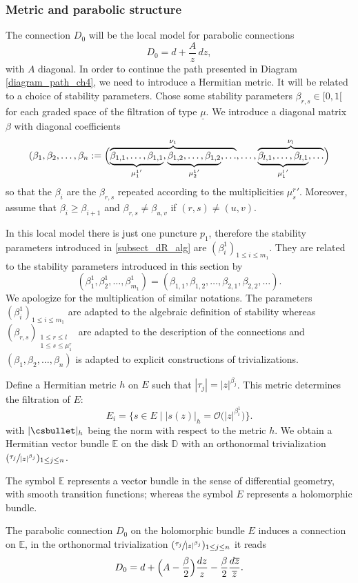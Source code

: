 \subsubsection{Metric and parabolic structure}
The connection $D_0$ will be the local model for parabolic connections
\[
D_0 = d + \frac{A}{z}\, dz,
\]
with $A$ diagonal. In order to continue the path presented in Diagram \eqref{diagram_path_ch4}, we need to introduce a Hermitian metric. It will be related to a choice of stability parameters. Chose some stability parameters $\beta_{r,s}\in [0,1[$ for each graded space of the filtration of type $\underline{\mu}$. We introduce a diagonal matrix $\beta$ with diagonal coefficients
\[
(\beta_1,\beta_2,\dots,\beta_n := \Bigl(\overbrace{\underbrace{\beta_{1,1},\dots,\beta_{1,1}}_{{\mu^1_1}'},\underbrace{\beta_{1,2},\dots,\beta_{1,2}}_{{\mu^1_2}'},\dots}^{\nu_1},\dots,\overbrace{\underbrace{\beta_{l,1},\dots,\beta_{l,1}}_{{\mu^l_1}'},\dots }^{\nu_l} \Bigr)
\]
so that the $\beta_i$ are the $\beta_{r,s}$ repeated according to the multiplicities ${\mu^r_s}'$. Moreover, assume that $\beta_i \ge \beta_{i+1}$ and $\beta_{r,s}\ne \beta_{u,v}$ if $(r,s)\ne(u,v)$.
\begin{remark}\label{remark_various_beta}
In this local model there is just one puncture $p_1$, therefore the stability parameters introduced in \ref{subsect_dR_alg} are $(\beta^1_i)_{1\le i \le m_1}$. They are related to the stability parameters introduced in this section by
\[
(\beta^1_1,\beta^1_2,\dots,\beta^1_{m_1})=(\beta_{1,1},\beta_{1,2},\dots,\beta_{2,1},\beta_{2,2},\dots).
\]
We apologize for the multiplication of similar notations. The parameters $(\beta^1_i)_{1\le i \le m_1}$ are adapted to the algebraic definition of stability whereas $(\beta_{r,s})_{\substack{1\le r \le l \\ 1 \le s \le \mu^r_1 }}$ are adapted to the description of the connections and $(\beta_1,\beta_2,\dots,\beta_n)$ is adapted to explicit constructions of trivializations.
\end{remark}
Define a Hermitian metric $h$ on $E$ such that $|\tau_j| = |z|^{\beta_j}$. This metric determines the filtration of $E$:
\[
E_i = \bigl\lbrace s\in E \mid | s(z) |_h = \mathcal{O}\bigl(| z|^{\beta^1_i}\bigr)\bigr\rbrace.
\]
with $|\csbullet|_h$ being the norm with respect to the metric $h$. We obtain a Hermitian vector bundle $\mathbb{E}$ on the disk $\mathbb{D}$ with an orthonormal trivialization $(\sfrac{\tau_j}{|z|^{\beta_j}})_{1\le j \le n}$.
\begin{notations}
The symbol $\mathbb{E}$ represents a vector bundle in the sense of differential geometry, with smooth transition functions; whereas the symbol $E$ represents a holomorphic bundle.
\end{notations}
The parabolic connection $D_0$ on the holomorphic bundle $E$ induces a connection on $\mathbb{E}$, in the orthonormal trivialization $(\sfrac{\tau_j}{|z|^{\beta_j}})_{1\le j \le n}$ it reads
\[
D_0 = d + \Bigl(A -\frac{\beta}{2}\Bigr) \frac{d z}{z} -\frac{\beta}{2} \frac{d \overline{z}}{\overline{z}}.
\]

